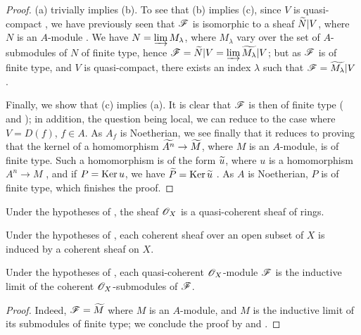 \begin{proof}
\label{proof-1.1.5.1}
(a) trivially implies (b). To see that (b) implies (c), since $V$ is quasi-compact
, we have previously seen that $\mathscr{F}$ is isomorphic to a
sheaf $\widetilde{N}|V$, where $N$ is an $A$-module . We have
$N=\varinjlim M_\lambda$, where $M_\lambda$ vary over the set of $A$-submodules of $N$ of finite type, hence
 $\mathscr{F}=\widetilde{N}|V=\varinjlim\widetilde{M_\lambda}|V$; but as $\mathscr{F}$
is of finite type, and $V$ is quasi-compact, there exists an index $\lambda$ such that
$\mathscr{F}=\widetilde{M_\lambda}|V$ .

Finally, we show that (c) implies (a). It is clear that $\mathscr{F}$ is then of finite type
( and ); in addition, the question being local, we can
reduce to the case where $V=D(f)$, $f\in A$. As $A_f$ is Noetherian, we see finally that it
reduces to proving that the kernel of a homomorphism $\widetilde{A^n}\to\widetilde{M}$, where
$M$ is an $A$-module, is of finite type. Such a homomorphism is of the form $\widetilde{u}$,
where $u$ is a homomorphism $A^n\to M$ , and if $P={\mathop{\mathrm{Ker}}\nolimits}\, u$, we have
$\widetilde{P}={\mathop{\mathrm{Ker}}\nolimits}\,\widetilde{u}$ . As $A$ is Noetherian, $P$ is of finite
type, which finishes the proof.
\end{proof}

\begin{cor}[1.5.2]
\label{1.1.5.2}
Under the hypotheses of , the sheaf $\mathscr{O}_X$ is a quasi-coherent sheaf of
rings.
\end{cor}

\begin{cor}[1.5.3]
\label{1.1.5.3}
Under the hypotheses of , each coherent sheaf over an open subset of $X$ is
induced by a coherent sheaf on $X$.
\end{cor}

\begin{cor}[1.5.4]
\label{1.1.5.4}
Under the hypotheses of , each quasi-coherent $\mathscr{O}_X$-module $\mathscr{F}$ is
the inductive limit of the coherent $\mathscr{O}_X$-submodules of $\mathscr{F}$.
\end{cor}

\begin{proof}
\label{proof-1.1.5.4}
Indeed, $\mathscr{F}=\widetilde{M}$ where $M$ is an $A$-module, and $M$ is the inductive limit of
its submodules of finite type; we conclude the proof by  and
.
\end{proof}

